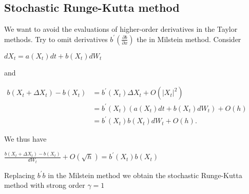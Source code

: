 \documentclass{article}
\begin{document}
\subsection{Stochastic Runge-Kutta method}
We want to avoid the evaluations of higher-order derivatives in the Taylor methods. Try to omit derivatives $b^{\prime }\left( \frac{\partial b}{\partial x} \right)  $ the in Milstein method. Consider
\begin{center}
	$d X_{t}=a\left(X_{t}\right) d t+b\left(X_{t}\right) d W_{t}$
\end{center}
and
\begin{center}
	$\begin{aligned} b\left(X_{t}+\Delta X_{t}\right)-b\left(X_{t}\right) &=b^{\prime}\left(X_{t}\right) \Delta X_{t}+O\left(\left|X_{t}\right|^{2}\right) \\ &=b^{\prime}\left(X_{t}\right)\left(a\left(X_{t}\right) d t+b\left(X_{t}\right) d W_{t}\right)+O(h) \\ &=b^{\prime}\left(X_{t}\right) b\left(X_{t}\right) d W_{t}+O(h) . \end{aligned}$
\end{center}
We thus have
\begin{center}
	$\frac{b\left(X_{t}+\Delta X_{t}\right)-b\left(X_{t}\right)}{d W_{t}}+O(\sqrt{h})=b^{\prime}\left(X_{t}\right) b\left(X_{t}\right)$
\end{center}
Replacing $b^{\prime }b$ in the Milstein method we obtain the stochastic Runge-Kutta method with strong order $\gamma=1$
\end{document}
